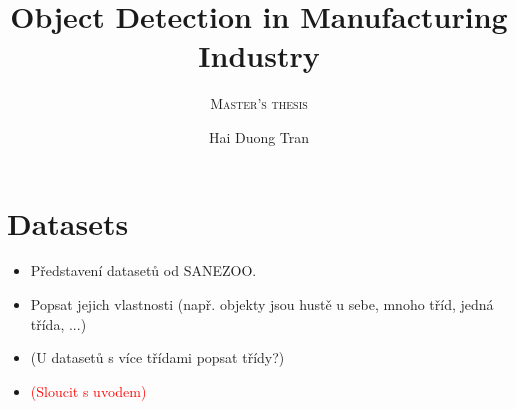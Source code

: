 \documentclass{mimosis}
\title{Object Detection in Manufacturing Industry}
\subtitle{\textsc{Master's thesis}}
\author{Hai Duong Tran}
\newcommand{\todo}[1]{\textcolor{red}{(#1)}}
\begin{document}
\frontmatter
%   
%   
%   
%   
  \tableofcontents

\mainmatter

    \let\cleardoublepage\clearpage
    
    
        \chapter{Datasets}
    \begin{itemize}
    \item Představení datasetů od SANEZOO.
    \item Popsat jejich vlastnosti (např. objekty jsou hustě u sebe, mnoho tříd, jedná třída, ...)
    \item (U datasetů s více třídami popsat třídy?)
    \item \todo{Sloucit s uvodem}
    \end{itemize}
    



    




\end{document}
